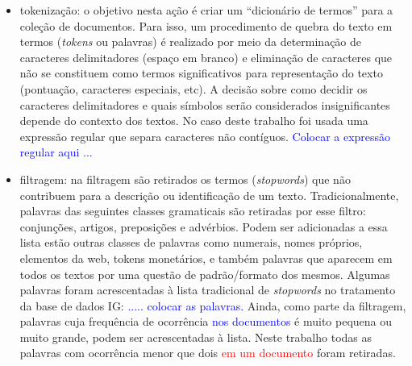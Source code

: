 \documentclass[
    12pt,                %
    oneside,            %
    a4paper,            %
    english,            %
    brazil                %
    ]{abntex2ppgsi}
\begin{document}
\begin{itemize}
\item tokenização: o objetivo nesta ação é criar um ``dicionário de termos'' para a coleção de documentos. Para isso, um procedimento de quebra do texto em termos (\textit{tokens} ou palavras) é realizado por meio da determinação de caracteres delimitadores (espaço em branco) e eliminação de caracteres que não se constituem como termos significativos para representação do texto (pontuação, caracteres especiais, etc). A decisão sobre como decidir os caracteres delimitadores e quais símbolos serão considerados insignificantes depende do contexto dos textos. No caso deste trabalho foi usada uma expressão regular que separa caracteres não contíguos. \textcolor{blue}{Colocar a expressão regular aqui ... }
\item filtragem: na filtragem são retirados os termos (\textit{stopwords}) que não contribuem para a descrição ou identificação de um texto. Tradicionalmente, palavras das seguintes classes gramaticais são retiradas por esse filtro: conjunções, artigos, preposições e advérbios. Podem ser adicionadas a essa lista estão outras classes de palavras como numerais, nomes próprios, elementos da web, tokens monetários, e também palavras que aparecem em todos os textos por uma questão de padrão/formato dos mesmos. Algumas palavras foram acrescentadas à lista tradicional de \textit{stopwords} no tratamento da base de dados IG: \textcolor{blue}{..... colocar as palavras.}  Ainda, como parte da filtragem, palavras cuja frequência de ocorrência \textcolor{blue}{nos documentos} é muito pequena ou muito grande, podem ser acrescentadas à lista. Neste trabalho todas as palavras com ocorrência menor que dois \textcolor{red}{em um documento} foram retiradas.  %
\end{itemize}


\end{document}
